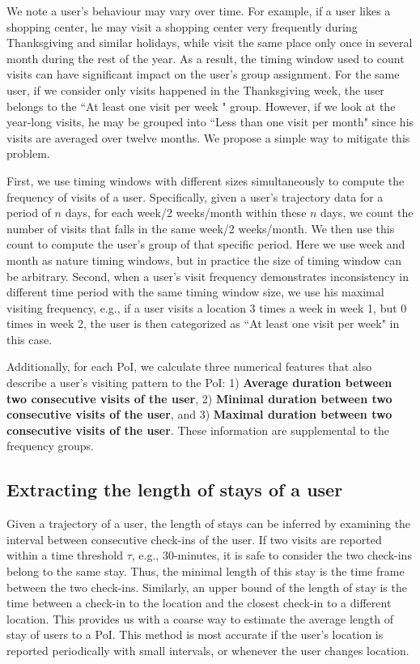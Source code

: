 We note a user's behaviour may vary over time. For example, if a user likes a shopping center, he may visit a shopping center very frequently during Thanksgiving and similar holidays, while visit the same place only once in several month during the rest of the year. As a result, the timing window used to count visits can have significant impact on the user's group assignment. For the same user, if we consider only visits happened in the Thanksgiving week, the user belongs to the ``At least one visit per week " group. However, if we look at the year-long visits, he may be grouped into ``Less than one visit per month" since his visits are averaged over twelve months. We propose a simple way to mitigate this problem.

First, we use timing windows with different sizes simultaneously to compute the frequency of visits of a user. Specifically, given a user's trajectory data for a period of $n$ days, for each week/2 weeks/month within these $n$ days, we count the number of visits that falls in the same week/2 weeks/month. We then use this count to compute the user's group of that specific period. Here we use week and month as nature timing windows, but in practice the size of timing window can be arbitrary. Second, when a user's visit frequency demonstrates inconsistency in different time period with the same timing window size, we use his maximal visiting frequency, e.g., if a user visits a location 3 times a week in week 1, but 0 times in week 2, the user is then categorized as ``At least one visit per week" in this case. 

Additionally, for each PoI, we calculate three numerical features that also describe a user's visiting pattern to the PoI: 1) \textbf{Average duration between two consecutive visits of the user}, 2) \textbf{Minimal duration between two consecutive visits of the user}, and 3) \textbf{Maximal duration between two consecutive visits of the user}. These information are supplemental to the frequency groups. 


\subsection{Extracting the length of stays of a user}

Given a trajectory of a user, the length of stays can be inferred by examining the interval between consecutive check-ins of the user. If two visits are reported within a time threshold $\tau$, e.g., 30-minutes, it is safe to consider the two check-ins belong to the same stay. Thus, the minimal length of this stay is the time frame between the two check-ins. Similarly, an upper bound of the length of stay is the time between a check-in to the location and the closest check-in to a different location. This provides us with a coarse way to estimate the average length of stay of users to a PoI. This method is most accurate if the user's location is reported periodically with small intervals, or whenever the user changes location.

